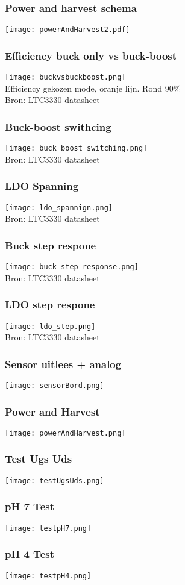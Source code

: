 \begin{frame}
    \frametitle{Power and harvest schema}
    \centering
    \texttt{[image: powerAndHarvest2.pdf]}
\end{frame}

\begin{frame}
    \frametitle{Efficiency buck only vs buck-boost}
    \centering
    \texttt{[image: buckvsbuckboost.png]}\\
    Efficiency gekozen mode, oranje lijn. Rond 90\%\\
    Bron: LTC3330 datasheet
\end{frame}

\begin{frame}
    \frametitle{Buck-boost swithcing}
    \centering
    \texttt{[image: buck\_boost\_switching.png]}\\
    Bron: LTC3330 datasheet
\end{frame}

\begin{frame}
    \frametitle{LDO Spanning}
    \centering
    \texttt{[image: ldo\_spannign.png]}\\
    Bron: LTC3330 datasheet
\end{frame}

\begin{frame}
    \frametitle{Buck step respone}
    \centering
    \texttt{[image: buck\_step\_response.png]}\\
    Bron: LTC3330 datasheet
\end{frame}

\begin{frame}
    \frametitle{LDO step respone}
    \centering
    \texttt{[image: ldo\_step.png]}\\
    Bron: LTC3330 datasheet
\end{frame}

\begin{frame}
    \frametitle{Sensor uitlees + analog}
    \centering
    \texttt{[image: sensorBord.png]}\\
\end{frame}

\begin{frame}
    \frametitle{Power and Harvest}
    \centering
    \texttt{[image: powerAndHarvest.png]}\\
\end{frame}

\begin{frame}
    \frametitle{Test Ugs Uds}
    \centering
    \texttt{[image: testUgsUds.png]}\\
\end{frame}

\begin{frame}
    \frametitle{pH 7 Test}
    \centering
    \texttt{[image: testpH7.png]}\\
\end{frame}

\begin{frame}
    \frametitle{pH 4 Test}
    \centering
    \texttt{[image: testpH4.png]}\\
\end{frame}